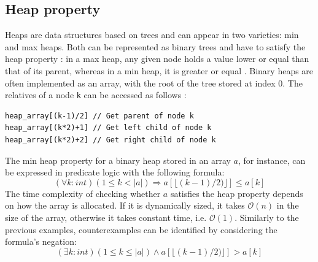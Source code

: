 \subsection{Heap property}
Heaps are data structures based on trees and can appear in two varieties: min and max heaps. Both can be represented as binary trees and have to satisfy the heap property \cite{dict_heap}: in a max heap, any given node holds a value lower or equal than that of its parent, whereas in a min heap, it is greater or equal \cite{dict_heap_property}. Binary heaps are often implemented as an array, with the root of the tree stored at index 0. The relatives of a node \texttt{k} can be accessed as follows \cite{dict_binary_heap}:
\begin{lstlisting}[language=Solidity, numbers=none, caption=Access a binary heap in array representation \cite{bernhardt_veigel_2020}]
heap_array[(k-1)/2] // Get parent of node k
heap_array[(k*2)+1] // Get left child of node k
heap_array[(k*2)+2] // Get right child of node k
\end{lstlisting}
The min heap property for a binary heap stored in an array $a$, for instance, can be expressed in predicate logic with the following formula:
\begin{equation}\label{eq:heap-unversial}
  (\forall k : int) (1 \le k < |a|) \Rightarrow a[\lfloor(k-1)/2)\rfloor] \le a[k]
\end{equation}
The time complexity of checking whether $a$ satisfies the heap property depends on how the array is allocated. If it is dynamically sized, it takes $\mathcal{O}(n)$ in the size of the array, otherwise it takes constant time, i.e. $\mathcal{O}(1)$.  Similarly to the previous examples, counterexamples can be identified by considering the formula's negation:
\begin{equation}\label{eq:heap-unversial-neg}
  (\exists k : int) (1 \le k \le |a|) \land a[\lfloor(k-1)/2)\rfloor] > a[k]
\end{equation}

